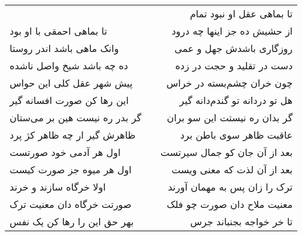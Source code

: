 \begin{center}
\begin{longtable}{l p{0.5cm} r}
&&
تا بماهی عقل او نبود تمام
\\
تا بماهی احمقی با او بود
&&
از حشیش ده جز اینها چه درود
\\
وانک ماهی باشد اندر روستا
&&
روزگاری باشدش جهل و عمی
\\
ده چه باشد شیخ واصل ناشده
&&
دست در تقلید و حجت در زده
\\
پیش شهر عقل کلی این حواس
&&
چون خران چشم‌بسته در خراس
\\
این رها کن صورت افسانه گیر
&&
هل تو دردانه تو گندم‌دانه گیر
\\
گر بدر ره نیست هین بر می‌ستان
&&
گر بدان ره نیستت این سو بران
\\
ظاهرش گیر ار چه ظاهر کژ پرد
&&
عاقبت ظاهر سوی باطن برد
\\
اول هر آدمی خود صورتست
&&
بعد از آن جان کو جمال سیرتست
\\
اول هر میوه جز صورت کیست
&&
بعد از آن لذت که معنی ویست
\\
اولا خرگاه سازند و خرند
&&
ترک را زان پس به مهمان آورند
\\
صورتت خرگاه دان معنیت ترک
&&
معنیت ملاح دان صورت چو فلک
\\
بهر حق این را رها کن یک نفس
&&
تا خر خواجه بجنباند جرس
\\
\end{longtable}
\end{center}
